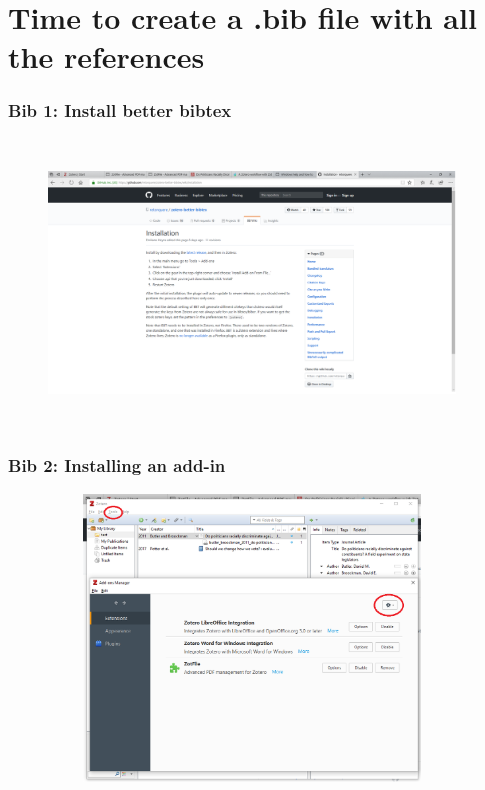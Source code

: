 \documentclass[12pt]{beamer}
\begin{document}
\section{Time to create a .bib file with all the references}

\begin{frame} \frametitle{Bib 1: Install better bibtex} \begin{figure}[!h] \centering
	\includegraphics[height=3in, width = 4.25in,keepaspectratio]{zotero/bibtex_1.png}
\end{figure} \end{frame}

\begin{frame} \frametitle{Bib 2: Installing an add-in} \begin{figure}[!h] \centering
	\includegraphics[height=3in, width = 4.25in,keepaspectratio]{zotero/bibtex_2.png}
\end{figure} \end{frame}
\end{document}
